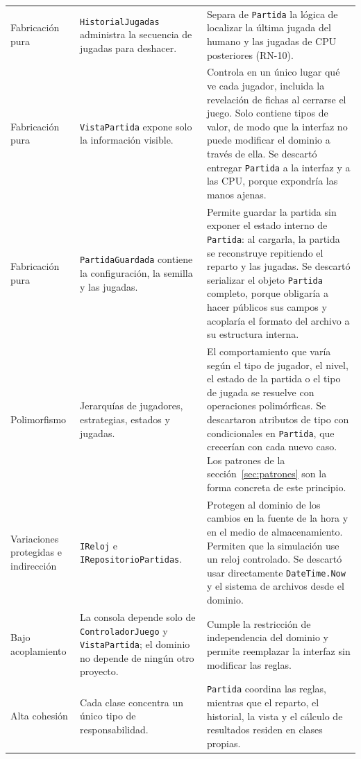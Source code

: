 {\begin{longtable}{@{}L{2.7cm}L{4.3cm}L{7.5cm}@{}}
  Fabricación pura & \texttt{HistorialJugadas} administra la secuencia de jugadas para deshacer. & Separa de \texttt{Partida} la lógica de localizar la última jugada del humano y las jugadas de CPU posteriores (RN-10). \\ \filasep
  Fabricación pura & \texttt{VistaPartida} expone solo la información visible. & Controla en un único lugar qué ve cada jugador, incluida la revelación de fichas al cerrarse el juego. Solo contiene tipos de valor, de modo que la interfaz no puede modificar el dominio a través de ella. Se descartó entregar \texttt{Partida} a la interfaz y a las CPU, porque expondría las manos ajenas. \\ \filasep
  Fabricación pura & \texttt{PartidaGuardada} contiene la configuración, la semilla y las jugadas. & Permite guardar la partida sin exponer el estado interno de \texttt{Partida}: al cargarla, la partida se reconstruye repitiendo el reparto y las jugadas. Se descartó serializar el objeto \texttt{Partida} completo, porque obligaría a hacer públicos sus campos y acoplaría el formato del archivo a su estructura interna. \\ \filasep
  Polimorfismo & Jerarquías de jugadores, estrategias, estados y jugadas. & El comportamiento que varía según el tipo de jugador, el nivel, el estado de la partida o el tipo de jugada se resuelve con operaciones polimórficas. Se descartaron atributos de tipo con condicionales en \texttt{Partida}, que crecerían con cada nuevo caso. Los patrones de la sección~\ref{sec:patrones} son la forma concreta de este principio. \\ \filasep
  Variaciones protegidas e indirección & \texttt{IReloj} e \texttt{IRepositorioPartidas}. & Protegen al dominio de los cambios en la fuente de la hora y en el medio de almacenamiento. Permiten que la simulación use un reloj controlado. Se descartó usar directamente \texttt{DateTime.Now} y el sistema de archivos desde el dominio. \\ \filasep
  Bajo acoplamiento & La consola depende solo de \texttt{ControladorJuego} y \texttt{VistaPartida}; el dominio no depende de ningún otro proyecto. & Cumple la restricción de independencia del dominio y permite reemplazar la interfaz sin modificar las reglas. \\ \filasep
  Alta cohesión & Cada clase concentra un único tipo de responsabilidad. & \texttt{Partida} coordina las reglas, mientras que el reparto, el historial, la vista y el cálculo de resultados residen en clases propias. \\
\end{longtable}}

